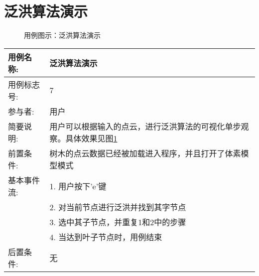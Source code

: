 \clearpage
\section{泛洪算法演示}
\begin{figure}[H]
	\centering
	\hfill
	\hfill
	\hfill
	\caption{用例图示：泛洪算法演示}
	\label{fig:uc7}
\end{figure}

\begin{table}[H]
	\centering
\begin{tabular}{|l|p{8cm}|}
	\hline
	用例名称: & 泛洪算法演示\\
	\hline
	用例标志号: & 7\\
	\hline
	参与者: & 用户\\
	\hline
	简要说明: & 用户可以根据输入的点云，进行泛洪算法的可视化单步观察。具体效果见图\ref{fig:uc7}\\
	\hline
	前置条件: & 树木的点云数据已经被加载进入程序，并且打开了体素模型模式\\
	\hline
	基本事件流: & 1. 用户按下'e'键\\
	 & 2. 对当前节点进行泛洪并找到其字节点\\
	 & 3. 选中其子节点，并重复1和2中的步骤\\
	 & 4. 当达到叶子节点时，用例结束\\
	\hline
	后置条件: & 无\\
	\hline
\end{tabular}
\end{table}

